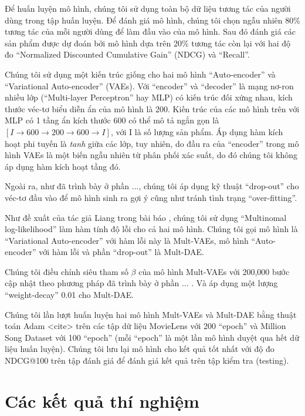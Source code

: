 Để huấn luyện mô hình, chúng tôi sử dụng toàn bộ dữ liệu tương tác của người dùng trong tập huấn luyện. Để đánh giá mô hình, chúng tôi chọn ngẫu nhiên 80\% tương tác của mỗi người dùng để làm đầu vào của mô hình. Sau đó đánh giá các sản phẩm được dự đoán bởi mô hình dựa trên 20\% tương tác còn lại với hai độ đo ``Normalized Discounted Cumulative Gain'' (NDCG) và ``Recall''.

Chúng tôi sử dụng một kiến trúc giống cho hai mô hình ``Auto-encoder'' và ``Variational Auto-encoder'' (VAEs). Với ``encoder'' và ``decoder'' là mạng nơ-ron nhiều lớp (``Multi-layer Perceptron'' hay MLP) có kiến trúc đối xứng nhau, kích thước véc-tơ biểu diễn ẩn của mô hình là 200. Kiến trúc của các mô hình trên với MLP có 1 tầng ẩn kích thước 600 có thể mô tả ngắn gọn là $[ I \to 600 \to 200 \to 600 \to I ]$, với I là số lượng sản phẩm. Áp dụng hàm kích hoạt phi tuyến là \textit{tanh} giữa các lớp, tuy nhiên, do đầu ra của ``encoder'' trong mô hình VAEs là một biến ngẫu nhiên từ phân phối xác suất, do đó chúng tôi không áp dụng hàm kích hoạt tầng đó.

Ngoài ra, như đã trình bày ở phần ..., chúng tôi áp dụng kỹ thuật ``drop-out'' cho véc-tơ đầu vào để mô hình sinh ra gợi ý cũng như tránh tình trạng ``over-fitting''.

Như đề xuất của tác giả Liang trong bài báo \cite{mvae}, chúng tôi sử dụng ``Multinomal log-likelihood'' làm hàm tính độ lỗi cho cả hai mô hình. Chúng tôi gọi mô hình là ``Variational Auto-encoder'' với hàm lỗi này là Mult-VAEs, mô hình ``Auto-encoder'' với hàm lỗi và phần ``drop-out'' là Mult-DAE.

Chúng tôi điều chỉnh siêu tham số $\beta$ của mô hình Mult-VAEs với 200,000 bước cập nhật theo phương pháp đã trình bày ở phần ... . Và áp dụng một lượng ``weight-decay'' 0.01 cho Mult-DAE. 

Chúng tôi lần lượt huấn luyện hai mô hình Mult-VAEs và Mult-DAE bằng thuật toán Adam <cite> trên các tập dữ liệu MovieLens \cite{Ml20M} với 200 ``epoch'' và Million Song Dataset \cite{MSD} với 100 ``epoch'' (mỗi ``epoch'' là một lần mô hình duyệt qua hết dữ liệu huấn luyện). Chúng tôi lưu lại mô hình cho kết quả tốt nhất với độ đo NDCG@100 trên tập đánh giá để đánh giá kết quả trên tập kiểm tra (testing).







\section{Các kết quả thí nghiệm}
